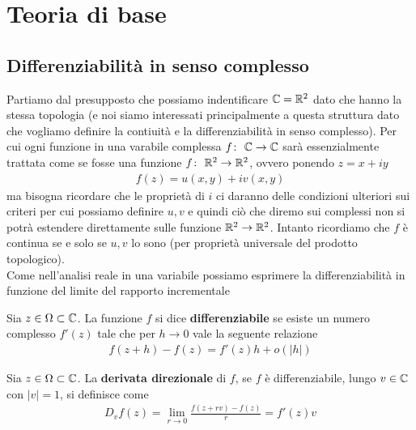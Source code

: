 
\chapter{Teoria di base}

\section{Differenziabilità in senso complesso}

Partiamo dal presupposto che possiamo indentificare $\mathbb{C} = \mathbb{R}^2$ dato che hanno la stessa topologia (e noi siamo interessati principalmente a questa struttura dato che vogliamo definire la contiuità e la differenziabilità in senso complesso). Per cui ogni funzione in una varabile complessa $f \colon\ \mathbb{C} \rightarrow \mathbb{C}$ sarà essenzialmente trattata come se fosse una funzione $f \colon\ \mathbb{R}^2 \rightarrow \mathbb{R}^2$, ovvero ponendo $z = x + iy$
\begin{equation}
\begin{aligned}
	f(z) = u(x,y) + iv(x,y)
\end{aligned}
\end{equation}
ma bisogna ricordare che le proprietà di $i$ ci daranno delle condizioni ulteriori sui criteri per cui possiamo definire $u, v$ e quindi ciò che diremo sui complessi non si potrà estendere direttamente sulle funzione $\mathbb{R}^2 \to \mathbb{R}^2$. Intanto ricordiamo che $f$ è continua se e solo se $u,v$ lo sono (per proprietà universale del prodotto topologico).\\

Come nell'analisi reale in una variabile possiamo esprimere la differenziabilità in funzione del limite del rapporto incrementale

\begin{definition}
	Sia $z \in \Omega \subset \mathbb{C}$. La funzione $f$ si dice \textbf{differenziabile} se esiste un numero complesso $f'(z)$ tale che per $h \to 0$ vale la seguente relazione
	\begin{equation}
	\begin{aligned}
		f(z+ h) - f(z) = f'(z)h + o(|h|)
	\end{aligned}
	\end{equation} 
\end{definition}

\begin{definition}
	Sia $z \in \Omega \subset \mathbb{C}$. La \textbf{derivata direzionale} di $f$, se $f$ è differenziabile, lungo $v \in \mathbb{C}$ con $|v| = 1$, si definisce come
	\begin{equation}
	\begin{aligned}
		D_v f(z) = \lim_{r \to 0} \frac{f(z + rv) - f(z)}{r} = f'(z) v
	\end{aligned}
	\end{equation}
\end{definition}


